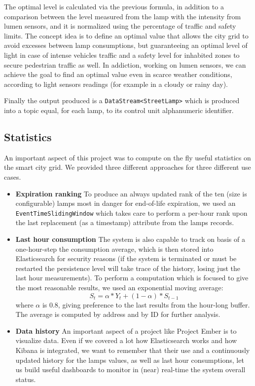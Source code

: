 The optimal level is calculated via the previous formula, in addition to a comparison between the level measured from the lamp with the intensity from lumen sensors, and it is normalized using the percentage of traffic and safety limits. The concept idea is to define an optimal value that allows the city grid to avoid excesses between lamp consumptions, but guaranteeing an optimal level of light in case of intense vehicles traffic and a safety level for inhabited zones to secure pedestrian traffic as well. In addiction, working on lumen sensors, we can achieve the goal to find an optimal value even in scarce weather conditions, according to light sensors readings (for example in a cloudy or rainy day).

Finally the output produced is a \texttt{DataStream<StreetLamp>} which is produced into a topic equal, for each lamp, to its control unit alphanumeric identifier.

\subsection*{Statistics}
An important aspect of this project was to compute on the fly useful statistics on the smart city grid. We provided three different approaches for three different use cases.
\begin{itemize}
	\item \textbf{Expiration ranking} To produce an always updated rank of the ten (size is configurable) lamps most in danger for end-of-life expiration, we used an \texttt{EventTimeSlidingWindow} which takes care to perform a per-hour rank upon the last replacement (as a timestamp) attribute from the lamps records.
	\item \textbf{Last hour consumption} The system is also capable to track on basis of a one-hour-step the consumption average, which is then stored into Elasticsearch for security reasons (if the system is terminated or must be restarted the persistence level will take trace of the history, losing just the last hour measurements). To perform a computation which is focused to give the most reasonable results, we used an exponential moving average:
$$S_t = \alpha*Y_t + (1 - \alpha)*S_{t-1}$$
where $\alpha$ is 0.8, giving preference to the last results from the hour-long buffer. The average is computed by address and by ID for further analysis.
	\item \textbf{Data history} An important aspect of a project like Project Ember is to visualize data. Even if we covered a lot how Elasticsearch works and how Kibana is integrated, we want to remember that their use and a continuously updated history for the lamps values, as well as last hour consumptions, let us build useful dashboards to monitor in (near) real-time the system overall status.
\end{itemize}

